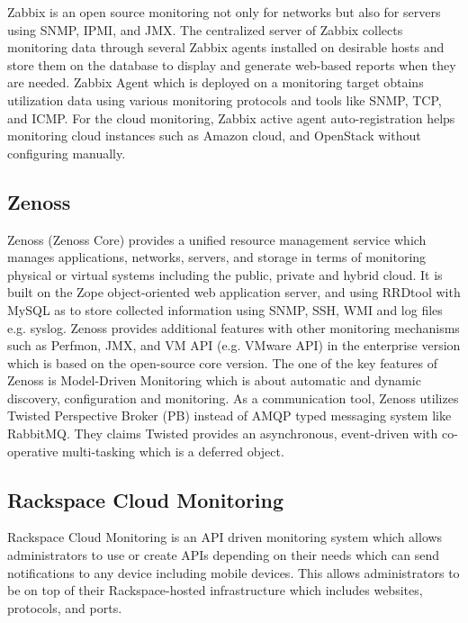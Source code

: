 \documentclass{sig-alternate-05-2015}
\begin{document}
Zabbix is an open source monitoring not only for networks but also for servers using SNMP, IPMI, and JMX. The centralized server of Zabbix collects monitoring data through several Zabbix agents installed on desirable hosts and store them on the database to display and generate web-based reports when they are needed. Zabbix Agent which is deployed on a monitoring target obtains utilization data using various monitoring protocols and tools like SNMP, TCP, and ICMP. For the cloud monitoring, Zabbix active agent auto-registration helps monitoring cloud instances such as Amazon cloud, and OpenStack without configuring manually.

\subsection{Zenoss}

Zenoss (Zenoss Core) provides a unified resource management service which manages applications, networks, servers, and storage in terms of monitoring physical or virtual systems including the public, private and hybrid cloud. It is built on the Zope object-oriented web application server, and using RRDtool with MySQL as to store collected information using SNMP, SSH, WMI and log files e.g. syslog. Zenoss provides additional features with other monitoring mechanisms such as Perfmon, JMX, and VM API (e.g. VMware API) in the enterprise version which is based on the open-source core version. The one of the key features of Zenoss is Model-Driven Monitoring which is about automatic and dynamic discovery, configuration and monitoring. As a communication tool, Zenoss utilizes Twisted Perspective Broker (PB) instead of AMQP typed messaging system like RabbitMQ. They claims Twisted provides an asynchronous, event-driven with co-operative multi-tasking which is a deferred object.

\subsection{Rackspace Cloud Monitoring}

Rackspace Cloud Monitoring is an API driven monitoring system which allows administrators to use or create APIs depending on their needs which can send notifications to any device including mobile devices. This allows administrators to be on top of their Rackspace-hosted infrastructure which includes websites, protocols, and ports.

\fi
\end{document}
